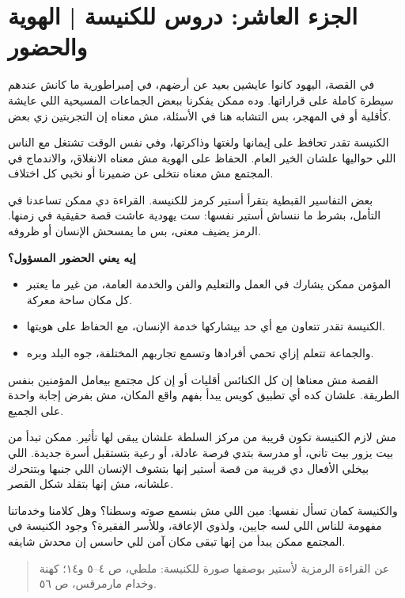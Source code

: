 \documentclass[12pt,a4paper]{article}
\begin{document}
\section*{الجزء العاشر: دروس للكنيسة | الهوية والحضور}
في القصة، اليهود كانوا عايشين بعيد عن أرضهم، في إمبراطورية ما كانش عندهم سيطرة كاملة على قراراتها. وده ممكن يفكرنا ببعض الجماعات المسيحية اللي عايشة كأقلية أو في المهجر، بس التشابه هنا في الأسئلة، مش معناه إن التجربتين زي بعض.\par\medskip
الكنيسة تقدر تحافظ على إيمانها ولغتها وذاكرتها، وفي نفس الوقت تشتغل مع الناس اللي حواليها علشان الخير العام. الحفاظ على الهوية مش معناه الانغلاق، والاندماج في المجتمع مش معناه نتخلى عن ضميرنا أو نخبي كل اختلاف.\par\medskip
بعض التفاسير القبطية بتقرأ أستير كرمز للكنيسة. القراءة دي ممكن تساعدنا في التأمل، بشرط ما ننساش أستير نفسها: ست يهودية عاشت قصة حقيقية في زمنها. الرمز يضيف معنى، بس ما يمسحش الإنسان أو ظروفه.\par\medskip
\vspace{0.2em}\noindent\textcolor{ochre}{\textbf{إيه يعني الحضور المسؤول؟}}\par\smallskip
\begin{itemize}[rightmargin=1.2em,leftmargin=0.5em,itemsep=0.25em,topsep=0.2em]
\item المؤمن ممكن يشارك في العمل والتعليم والفن والخدمة العامة، من غير ما يعتبر كل مكان ساحة معركة.
\item الكنيسة تقدر تتعاون مع أي حد بيشاركها خدمة الإنسان، مع الحفاظ على هويتها.
\item والجماعة تتعلم إزاي تحمي أفرادها وتسمع تجاربهم المختلفة، جوه البلد وبره.
\end{itemize}\medskip
القصة مش معناها إن كل الكنائس أقليات أو إن كل مجتمع بيعامل المؤمنين بنفس الطريقة. علشان كده أي تطبيق كويس يبدأ بفهم واقع المكان، مش بفرض إجابة واحدة على الجميع.\par\medskip
مش لازم الكنيسة تكون قريبة من مركز السلطة علشان يبقى لها تأثير. ممكن تبدأ من بيت يزور بيت تاني، أو مدرسة بتدي فرصة عادلة، أو رعية بتستقبل أسرة جديدة. اللي بيخلي الأفعال دي قريبة من قصة أستير إنها بتشوف الإنسان اللي جنبها وبتتحرك علشانه، مش إنها بتقلد شكل القصر.\par\medskip
والكنيسة كمان تسأل نفسها: مين اللي مش بنسمع صوته وسطنا؟ وهل كلامنا وخدماتنا مفهومة للناس اللي لسه جايين، ولذوي الإعاقة، وللأسر الفقيرة؟ وجود الكنيسة في المجتمع ممكن يبدأ من إنها تبقى مكان آمن للي حاسس إن محدش شايفه.\par\medskip
\begin{quote}\small\color{muted}عن القراءة الرمزية لأستير بوصفها صورة للكنيسة: ملطي، ص ٤–٥ و١٤؛ كهنة وخدام مارمرقس، ص ٥٦.\end{quote}
\clearpage
\clearpage
\end{document}
